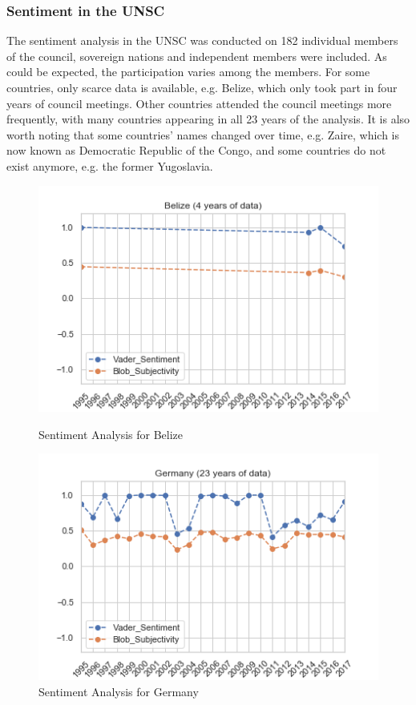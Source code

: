 \subsubsection{Sentiment in the UNSC}
The sentiment analysis in the UNSC was conducted on 182 individual members of the council, sovereign nations and independent members were included. As could be expected, the participation varies among the members. For some countries, only scarce data is available, e.g. Belize, which only took part in four years of council meetings. Other countries attended the council meetings more frequently, with many countries appearing in all 23 years of the analysis. It is also worth noting that some countries' names changed over time, e.g. Zaire, which is now known as Democratic Republic of the Congo, and some countries do not exist anymore, e.g. the former Yugoslavia.

\begin{figure}[t!]
    \centering
    \begin{minipage}{0.47\textwidth}
        \centering
        \includegraphics[width=1.1\textwidth]{img/Belize_average.png} %
        \caption{Sentiment Analysis for Belize}
        \label{belize}
    \end{minipage}\hfill
    \begin{minipage}{0.47\textwidth}
        \centering
        \includegraphics[width=1.1\textwidth]{img/Germany_average.png} %
        \caption{Sentiment Analysis for Germany}
        \label{germany}
    \end{minipage}
\end{figure}

